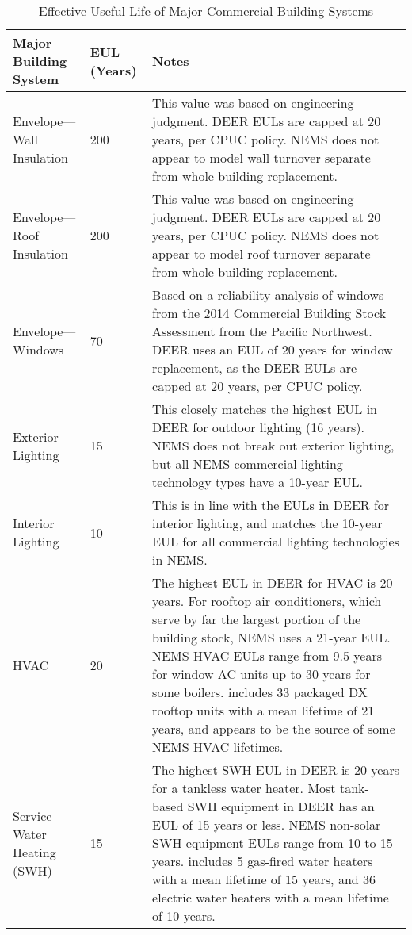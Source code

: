 \begin{table}
\small
\caption[Effective Useful Life of Major Commercial Building Systems]{Effective Useful Life of Major Commercial Building Systems}
\label{tab:effective_useful_life}
\centering
\begin{tabular}{|p{3cm}|p{1cm}|p{11cm}|}
\hline
\textbf{Major Building System}                       & \textbf{EUL (Years}) & \textbf{Notes} \\
\hline
Envelope---Wall Insulation                  & 200         & This value was based on engineering judgment. DEER EULs are capped at 20 years, per CPUC policy. NEMS does not appear to model wall turnover separate from whole-building replacement.\\
\hline
Envelope---Roof Insulation                  & 200         & This value was based on engineering judgment. DEER EULs are capped at 20 years, per CPUC policy. NEMS does not appear to model roof turnover separate from whole-building replacement.\\
\hline
Envelope---Windows                          & 70          & Based on a reliability analysis of windows from the 2014 Commercial Building Stock Assessment from the Pacific Northwest. DEER uses an EUL of 20 years for window replacement, as the DEER EULs are capped at 20 years, per CPUC policy.\\
\hline
Exterior Lighting                           & 15          & This closely matches the highest EUL in DEER for outdoor lighting (16 years). NEMS does not break out exterior lighting, but all NEMS commercial lighting technology types have a 10-year EUL.\\
\hline
Interior Lighting                           & 10          & This is in line with the EULs in DEER for interior lighting, and matches the 10-year EUL for all commercial lighting technologies in NEMS.\\
\hline
HVAC                                        & 20          & The highest EUL in DEER for HVAC is 20 years. For rooftop air conditioners, which serve by far the largest portion of the building stock, NEMS uses a 21-year EUL. NEMS HVAC EULs range from 9.5 years for window AC units up to 30 years for some boilers. \citet{ashrae_reliability_db} includes 33 packaged DX rooftop units with a mean lifetime of 21 years, and appears to be the source of some NEMS HVAC lifetimes.\\
\hline
Service Water Heating (SWH)                 & 15          & The highest SWH EUL in DEER is 20 years for a tankless water heater. Most tank-based SWH equipment in DEER has an EUL of 15 years or less. NEMS non-solar SWH equipment EULs range from 10 to 15 years. \citet{ashrae_reliability_db} includes 5 gas-fired water heaters with a mean lifetime of 15 years, and 36 electric water heaters with a mean lifetime of 10 years.\\

\end{tabular}
\end{table}

